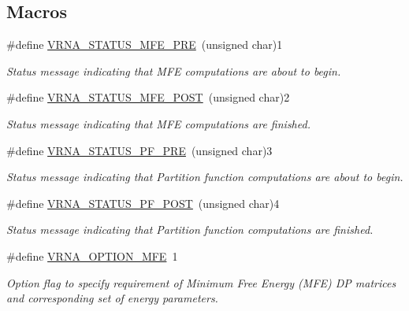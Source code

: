 \subsection*{Macros}
\begin{DoxyCompactItemize}
\item 
\#define \hyperlink{group__fold__compound_ga1a5053dc8acbb0111e852988726f07d6}{V\-R\-N\-A\-\_\-\-S\-T\-A\-T\-U\-S\-\_\-\-M\-F\-E\-\_\-\-P\-R\-E}~(unsigned char)1
\begin{DoxyCompactList}\small\item\em Status message indicating that M\-F\-E computations are about to begin. \end{DoxyCompactList}\item 
\#define \hyperlink{group__fold__compound_ga47c900ca76e56e59e2e83a06e0bde641}{V\-R\-N\-A\-\_\-\-S\-T\-A\-T\-U\-S\-\_\-\-M\-F\-E\-\_\-\-P\-O\-S\-T}~(unsigned char)2
\begin{DoxyCompactList}\small\item\em Status message indicating that M\-F\-E computations are finished. \end{DoxyCompactList}\item 
\#define \hyperlink{group__fold__compound_ga91795d35ebdb6f32be50459f24b3d114}{V\-R\-N\-A\-\_\-\-S\-T\-A\-T\-U\-S\-\_\-\-P\-F\-\_\-\-P\-R\-E}~(unsigned char)3
\begin{DoxyCompactList}\small\item\em Status message indicating that Partition function computations are about to begin. \end{DoxyCompactList}\item 
\#define \hyperlink{group__fold__compound_ga1c6fa243533fd026e50f7d595eaaa565}{V\-R\-N\-A\-\_\-\-S\-T\-A\-T\-U\-S\-\_\-\-P\-F\-\_\-\-P\-O\-S\-T}~(unsigned char)4
\begin{DoxyCompactList}\small\item\em Status message indicating that Partition function computations are finished. \end{DoxyCompactList}\item 
\#define \hyperlink{group__fold__compound_gae63be9127fe7dcc1f9bb14f5bb1064ee}{V\-R\-N\-A\-\_\-\-O\-P\-T\-I\-O\-N\-\_\-\-M\-F\-E}~1
\begin{DoxyCompactList}\small\item\em Option flag to specify requirement of Minimum Free Energy (M\-F\-E) D\-P matrices and corresponding set of energy parameters. \end{DoxyCompactList}\item 

\end{DoxyCompactItemize}
